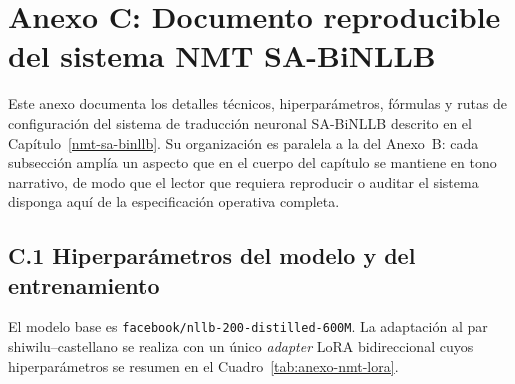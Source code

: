 \documentclass[12pt,a4paper,oneside]{book}
\begin{document}
\section*{Anexo C: Documento reproducible del sistema NMT SA-BiNLLB}\label{anexo-nmt-reproducible}

Este anexo documenta los detalles técnicos, hiperparámetros, fórmulas y rutas de configuración del sistema de traducción neuronal SA-BiNLLB descrito en el Capítulo~\ref{nmt-sa-binllb}. Su organización es paralela a la del Anexo~B: cada subsección amplía un aspecto que en el cuerpo del capítulo se mantiene en tono narrativo, de modo que el lector que requiera reproducir o auditar el sistema disponga aquí de la especificación operativa completa.

\subsection*{C.1 Hiperparámetros del modelo y del entrenamiento}\label{anexo-nmt-hp}

El modelo base es \texttt{facebook/nllb-200-distilled-600M}. La adaptación al par shiwilu--castellano se realiza con un único \emph{adapter} LoRA bidireccional cuyos hiperparámetros se resumen en el Cuadro~\ref{tab:anexo-nmt-lora}.
\end{document}
